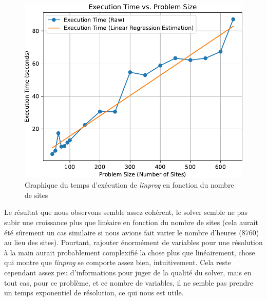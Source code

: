 \documentclass{article}
\newlength{\temp}
\begin{document}
\begin{figure}[h!]
    \centering
    \includegraphics[scale=0.5]{Images/Partie_1/Q3/execution_time_vs_problem_size.pdf}
    \caption{Graphique du temps d'exécution de \textit{linprog} en fonction du nombre de sites}
    \label{fig:execution_time_vs_problem_size_Q3}
\end{figure}
Le résultat que nous observons semble assez cohérent, le solver semble ne pas subir une croissance plus que linéaire en fonction du nombre de sites (cela aurait été sûrement un cas similaire si nous avions fait varier le nombre d'heures (8760) au lieu des sites). Pourtant, rajouter énormément de variables pour une résolution à la main aurait probablement complexifié la chose plus que linéairement, chose qui montre que \textit{linprog} se comporte assez bien, intuitivement. Cela reste cependant assez peu d'informations pour juger de la qualité du solver, mais en tout cas, pour ce problème, et ce nombre de variables, il ne semble pas prendre un temps exponentiel de résolution, ce qui nous est utile.
\end{document}
